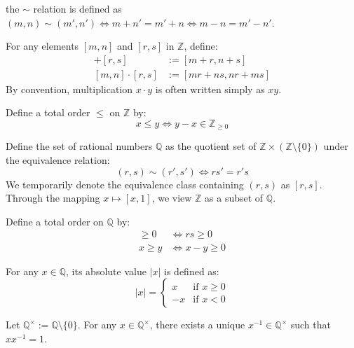 \documentclass[11pt,lang=en]{elegantbook}
\begin{document}
\begin{remark}
  the $\sim$ relation is defined as $(m,n)\sim(m',n')\iff m+n'=m'+n \iff m-n=m'-n'$.
\end{remark}

\begin{definition}
  For any elements $[m,n]$ and $[r,s]$ in $\mathbb{Z}$, define:
  \begin{align*}
    [m,n] + [r,s] &:= [m+r, n+s] \\
    [m,n] \cdot [r,s] &:= [mr+ns, nr+ms]
  \end{align*}
  By convention, multiplication $x \cdot y$ is often written simply as $xy$.
\end{definition}

\begin{definition}
  Define a total order $\leq$ on $\mathbb{Z}$ by:
  \[
    x \leq y \iff y-x \in \mathbb{Z}_{\geq 0}
  \]
\end{definition}

\begin{definition}
  Define the set of rational numbers $\mathbb{Q}$ as the quotient set of $\mathbb{Z} \times (\mathbb{Z} \setminus \{0\})$ under the equivalence relation:
  \[
    (r,s) \sim (r',s') \iff rs' = r's
  \]
  We temporarily denote the equivalence class containing $(r,s)$ as $[r,s]$. Through the mapping $x \mapsto [x,1]$, we view $\mathbb{Z}$ as a subset of $\mathbb{Q}$.
\end{definition}

\begin{definition}
  Define a total order on $\mathbb{Q}$ by:
  \begin{align*}
    [r,s] \geq 0 &\iff rs \geq 0 \\
    x \geq y &\iff x-y \geq 0
  \end{align*}

  For any $x \in \mathbb{Q}$, its absolute value $|x|$ is defined as:
  \[
    |x| =
    \begin{cases}
      x & \text{if } x \geq 0 \\
      -x & \text{if } x < 0
    \end{cases}
  \]
\end{definition}

\begin{proposition}
  Let $\mathbb{Q}^{\times} := \mathbb{Q} \setminus \{0\}$. For any $x \in \mathbb{Q}^{\times}$, there exists a unique $x^{-1} \in \mathbb{Q}^{\times}$ such that $xx^{-1} = 1$.
\end{proposition}
\end{document}
